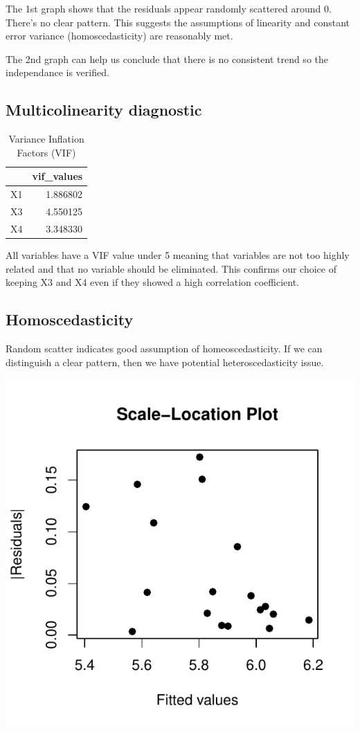 \documentclass[
  11pt,
]{article}
\begin{document}
The 1st graph shows that the residuals appear randomly scattered around
0. There's no clear pattern. This suggests the assumptions of linearity
and constant error variance (homoscedasticity) are reasonably met.

The 2nd graph can help us conclude that there is no consistent trend so
the independance is verified.

\subsection{Multicolinearity
diagnostic}\label{multicolinearity-diagnostic}

\begingroup\fontsize{8}{10}\selectfont

\begin{longtable}[t]{lr}
\caption{\label{tab:unnamed-chunk-16}Variance Inflation Factors (VIF)}\\
\toprule
 & vif\_values\\
\midrule
X1 & 1.886802\\
X3 & 4.550125\\
X4 & 3.348330\\
\bottomrule
\end{longtable}
\endgroup{}

All variables have a VIF value under 5 meaning that variables are not
too highly related and that no variable should be eliminated. This
confirms our choice of keeping X3 and X4 even if they showed a high
correlation coefficient.

\subsection{Homoscedasticity}\label{homoscedasticity}

Random scatter indicates good assumption of homeoscedasticity. If we can
distinguish a clear pattern, then we have potential heteroscedasticity
issue.

\includegraphics{Figs/unnamed-chunk-17-1.pdf}
\end{document}
